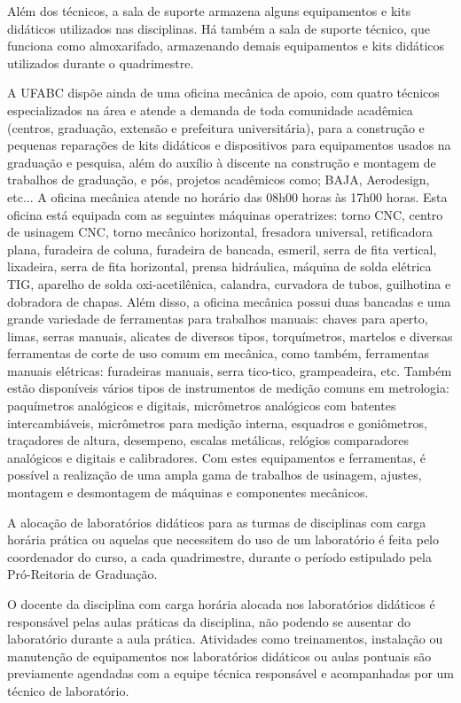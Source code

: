 \documentclass{article}
\begin{document}
Além dos técnicos, a sala de suporte armazena alguns equipamentos e kits didáticos utilizados nas disciplinas. Há também a sala de suporte técnico, que funciona como almoxarifado, armazenando demais equipamentos e kits didáticos utilizados durante o quadrimestre.

A UFABC dispõe ainda de uma oficina mecânica de apoio, com quatro técnicos especializados na área e atende a demanda de toda comunidade acadêmica (centros, graduação, extensão e prefeitura universitária), para a construção e pequenas reparações de kits didáticos e dispositivos para equipamentos usados na graduação e pesquisa, além do auxílio à discente na construção e montagem de trabalhos de graduação, e pós, projetos acadêmicos como; BAJA, Aerodesign, etc... A oficina mecânica atende no horário das 08h00 horas às 17h00 horas. Esta oficina está equipada com as seguintes máquinas operatrizes: torno CNC, centro de usinagem CNC, torno mecânico horizontal, fresadora universal, retificadora plana, furadeira de coluna, furadeira de bancada, esmeril, serra de fita vertical, lixadeira, serra de fita horizontal, prensa hidráulica, máquina de solda elétrica TIG, aparelho de solda oxi-acetilênica, calandra, curvadora de tubos, guilhotina e dobradora de chapas. Além disso, a oficina mecânica possui duas bancadas e uma grande variedade de ferramentas para trabalhos manuais: chaves para aperto, limas, serras manuais, alicates de diversos tipos, torquímetros, martelos e diversas ferramentas de corte de uso comum em mecânica, como também, ferramentas manuais elétricas: furadeiras manuais, serra tico-tico, grampeadeira, etc. Também estão disponíveis vários tipos de instrumentos de medição comuns em metrologia: paquímetros analógicos e digitais, micrômetros analógicos com batentes intercambiáveis, micrômetros para medição interna, esquadros e goniômetros, traçadores de altura, desempeno, escalas metálicas, relógios comparadores analógicos e digitais e calibradores. Com estes equipamentos e ferramentas, é possível a realização de uma ampla gama de trabalhos de usinagem, ajustes, montagem e desmontagem de máquinas e componentes mecânicos.

A alocação de laboratórios didáticos para as turmas de disciplinas com carga horária prática ou aquelas que necessitem do uso de um laboratório é feita pelo coordenador do curso, a cada quadrimestre, durante o período estipulado pela Pró-Reitoria de Graduação.

O docente da disciplina com carga horária alocada nos laboratórios didáticos é responsável pelas aulas práticas da disciplina, não podendo se ausentar do laboratório durante a aula prática.
Atividades como treinamentos, instalação ou manutenção de equipamentos nos laboratórios didáticos ou aulas pontuais são previamente agendadas com a equipe técnica responsável e acompanhadas por um técnico de laboratório.
\end{document}
